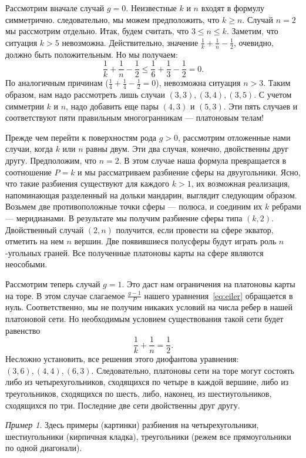 \documentclass[12pt, a4paper, openany]{amsart}
\theoremstyle{plain}
\theoremstyle{definition}
\theoremstyle{remark}
\newtheorem{e}[theorem]{Пример}
\begin{document}
Рассмотрим вначале случай $g=0$.  Неизвестные $k$ и $n$ входят в
формулу симметрично. следовательно, мы можем предположить, что
$k\ge n$. Случай $n=2$ мы рассмотрим отдельно. Итак, будем считать,
что $3\le n\le k$.  Заметим, что ситуация $k>5$
невозможна. Действительно, значение
$\frac{1}{k}+\frac{1}{n}-\frac{1}{2}$, очевидно, должно быть
положительным.  Но мы получаем:
$$
\frac{1}{k}+\frac{1}{n}-\frac{1}{2}\le \frac{1}{6}+\frac{1}{3}-\frac{1}{2}=0.
$$
По аналогичным причинам ($\frac{1}{4}+\frac{1}{4}-\frac{1}{2}=0$),
невозможна ситуация $n>3$.  Таким образом, нам надо рассмотреть лишь
случаи $(3,3), (3,4), (3,5)$.  С учетом симметрии $k$ и $n$, надо
добавить еще пары $(4,3)$ и $(5,3)$.  Эти пять случаев и соответствуют
пяти правильным многогранникам --- платоновым телам!
	   
Прежде чем перейти к поверхностям рода $g>0$, рассмотрим отложенные
нами случаи, когда $k$ или $n$ равны двум. Эти два случая, конечно,
двойственны друг другу. Предположим, что $n=2$. В этом случае наша
формула превращается в соотношение $P=k$ и мы рассматриваем разбиение
сферы на двуугольники.  Ясно, что такие разбиения существуют для
каждого $k>1$, их возможная реализация, напоминающая разделенный на
дольки мандарин, выглядит следующим образом. Возьмем две
противоположные точки сферы --- полюса, и соединим их $k$ ребрами ---
меридианами. В результате мы получим разбиение сферы типа
$(k,2)$. Двойственный случай $(2,n)$ получится, если провести на сфере
экватор, отметить на нем $n$ вершин. Две появившиеся полусферы будут
играть роль $n$-угольных граней. Все полученные платоновы карты на
сфере являются неособыми.
	   
Рассмотрим теперь случай $g=1$. Это даст нам ограничения на платоновы
карты на торе. В этом случае слагаемое $\frac{g-1}{P}$ нашего
уравнения~\ref{eq:eiler} обращается в нуль.  Соответственно, мы не получим
никаких условий на числа ребер в нашей платоновой сети. Но необходимым
условием существования такой сети будет равенство
$$
\frac{1}{k}+\frac{1}{n}=\frac{1}{2}.
$$
Несложно установить, все решения этого диофантова уравнения:
$(3,6), (4,4), (6,3)$. Следовательно, платоновы сети на торе могут
состоять либо из четырехугольников, сходящихся по четыре в каждой
вершине, либо из треугольников, сходящихся по шесть, либо, наконец, из
шестиугольников, сходящихся по три. Последние две сети двойственны
друг другу.

\begin{e}
  Здесь примеры (картинки) разбиения на четырехугольники,
  шестиугольники (кирпичная кладка), треугольники (режем все
  прямоугольники по одной диагонали).
\end{e}	   
	   
\end{document}
